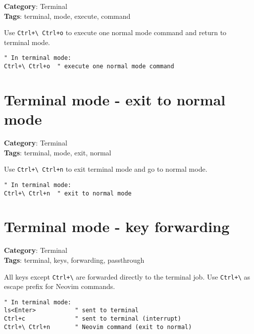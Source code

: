 {{{{{{{{{{{{{{\textbf{Category}: Terminal\\ \textbf{Tags}: terminal, mode, execute, command
\vspace{0.5cm}

Use {\footnotesize \Verb§Ctrl+\ Ctrl+o§} to execute one normal mode command and return to terminal mode.

\begin{Exa*}{}
\begin{Verbatim}[fontsize=\footnotesize, breaklines, breakanywhere]
" In terminal mode:
Ctrl+\ Ctrl+o  " execute one normal mode command
\end{Verbatim}
\end{Exa*}

\section{Terminal mode - exit to normal mode}

\textbf{Category}: Terminal\\ \textbf{Tags}: terminal, mode, exit, normal
\vspace{0.5cm}

Use {\footnotesize \Verb§Ctrl+\ Ctrl+n§} to exit terminal mode and go to normal mode.

\begin{Exa*}{}
\begin{Verbatim}[fontsize=\footnotesize, breaklines, breakanywhere]
" In terminal mode:
Ctrl+\ Ctrl+n  " exit to normal mode
\end{Verbatim}
\end{Exa*}

\section{Terminal mode - key forwarding}

\textbf{Category}: Terminal\\ \textbf{Tags}: terminal, keys, forwarding, passthrough
\vspace{0.5cm}

All keys except {\footnotesize \Verb§Ctrl+\§} are forwarded directly to the terminal job. Use {\footnotesize \Verb§Ctrl+\§} as escape prefix for Neovim commands.

\begin{Exa*}{}
\begin{Verbatim}[fontsize=\footnotesize, breaklines, breakanywhere]
" In terminal mode:
ls<Enter>           " sent to terminal
Ctrl+c              " sent to terminal (interrupt)
Ctrl+\ Ctrl+n       " Neovim command (exit to normal)
\end{Verbatim}
\end{Exa*}

}}}}}}}}}}}}}}
